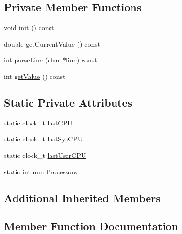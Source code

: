\subsection*{Private Member Functions}
\begin{DoxyCompactItemize}
\item 
void \hyperlink{classpcs_1_1Profiler_a2deaa67e03ee0db53b0eae8655c14926}{init} () const
\item 
double \hyperlink{classpcs_1_1Profiler_a6df1a4d33cbbef99e9414f3364277dfa}{get\+Current\+Value} () const
\item 
int \hyperlink{classpcs_1_1Profiler_a612e2478e778192c89d57c226b156dca}{parse\+Line} (char $\ast$line) const
\item 
int \hyperlink{classpcs_1_1Profiler_a7e1157796cb25fbcdb88ef6b3b806f3c}{get\+Value} () const
\end{DoxyCompactItemize}
\subsection*{Static Private Attributes}
\begin{DoxyCompactItemize}
\item 
static clock\+\_\+t \hyperlink{classpcs_1_1Profiler_a6f36349e69f9b4f5507062a377c55234}{last\+C\+PU}
\item 
static clock\+\_\+t \hyperlink{classpcs_1_1Profiler_aebf7ffb809ca337b87f669419f66abb3}{last\+Sys\+C\+PU}
\item 
static clock\+\_\+t \hyperlink{classpcs_1_1Profiler_a2617e476a0746490d5c74967671541c0}{last\+User\+C\+PU}
\item 
static int \hyperlink{classpcs_1_1Profiler_a62a967ce78e79c692d531b2e6b291d35}{num\+Processors}
\end{DoxyCompactItemize}
\subsection*{Additional Inherited Members}


\subsection{Member Function Documentation}
\mbox{\label{classpcs_1_1Profiler_a79c7f10f296aa9679ba3698b8f30e87e}} 
